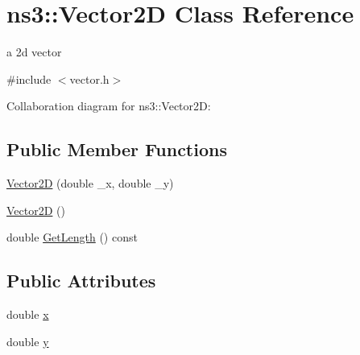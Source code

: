 \hypertarget{classns3_1_1Vector2D}{}\section{ns3\+:\+:Vector2D Class Reference}
\label{classns3_1_1Vector2D}


a 2d vector  




{\ttfamily \#include $<$vector.\+h$>$}



Collaboration diagram for ns3\+:\+:Vector2D\+:
\subsection*{Public Member Functions}
\begin{DoxyCompactItemize}
\item 
\hyperlink{classns3_1_1Vector2D_a10b1426d2d9476637240e4b3eb4038bb}{Vector2D} (double \+\_\+x, double \+\_\+y)
\item 
\hyperlink{classns3_1_1Vector2D_a6998ac88167c75311c6489025de96d42}{Vector2D} ()
\item 
double \hyperlink{classns3_1_1Vector2D_ad5274e725e4bbc4653cecce2d96febd3}{Get\+Length} () const 
\end{DoxyCompactItemize}
\subsection*{Public Attributes}
\begin{DoxyCompactItemize}
\item 
double \hyperlink{classns3_1_1Vector2D_a82ba41e508970719c0907b031eefa572}{x}
\item 
double \hyperlink{classns3_1_1Vector2D_a4ba4640626850d67ed91d76da816ee09}{y}
\end{DoxyCompactItemize}
